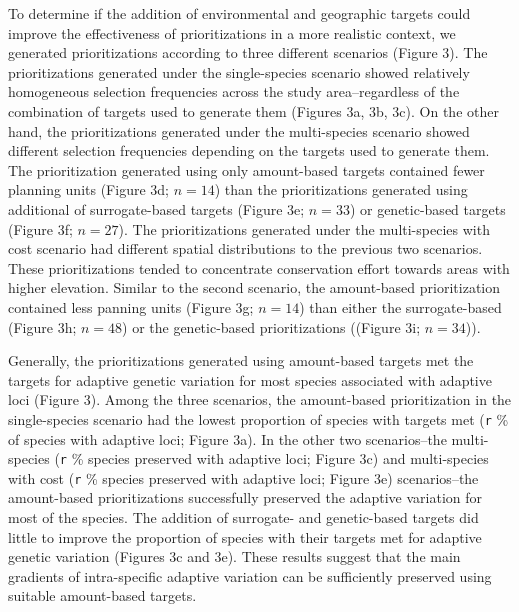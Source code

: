\documentclass[11pt,]{article}
\begin{document}
To determine if the addition of environmental and geographic targets
could improve the effectiveness of prioritizations in a more realistic
context, we generated prioritizations according to three different
scenarios (Figure 3). The prioritizations generated under the
single-species scenario showed relatively homogeneous selection
frequencies across the study area--regardless of the combination of
targets used to generate them (Figures 3a, 3b, 3c). On the other hand,
the prioritizations generated under the multi-species scenario showed
different selection frequencies depending on the targets used to
generate them. The prioritization generated using only amount-based
targets contained fewer planning units (Figure 3d; \(n = 14\)) than the
prioritizations generated using additional of surrogate-based targets
(Figure 3e; \(n = 33\)) or genetic-based targets (Figure 3f;
\(n = 27\)). The prioritizations generated under the multi-species with
cost scenario had different spatial distributions to the previous two
scenarios. These prioritizations tended to concentrate conservation
effort towards areas with higher elevation. Similar to the second
scenario, the amount-based prioritization contained less panning units
(Figure 3g; \(n = 14\)) than either the surrogate-based (Figure 3h;
\(n = 48\)) or the genetic-based prioritizations ((Figure 3i;
\(n = 34\))).

Generally, the prioritizations generated using amount-based targets met
the targets for adaptive genetic variation for most species associated
with adaptive loci (Figure 3). Among the three scenarios, the
amount-based prioritization in the single-species scenario had the
lowest proportion of species with targets met (\texttt{r} \% of species
with adaptive loci; Figure 3a). In the other two scenarios--the
multi-species (\texttt{r} \% species preserved with adaptive loci;
Figure 3c) and multi-species with cost (\texttt{r} \% species preserved
with adaptive loci; Figure 3e) scenarios--the amount-based
prioritizations successfully preserved the adaptive variation for most
of the species. The addition of surrogate- and genetic-based targets did
little to improve the proportion of species with their targets met for
adaptive genetic variation (Figures 3c and 3e). These results suggest
that the main gradients of intra-specific adaptive variation can be
sufficiently preserved using suitable amount-based targets.
\end{document}
